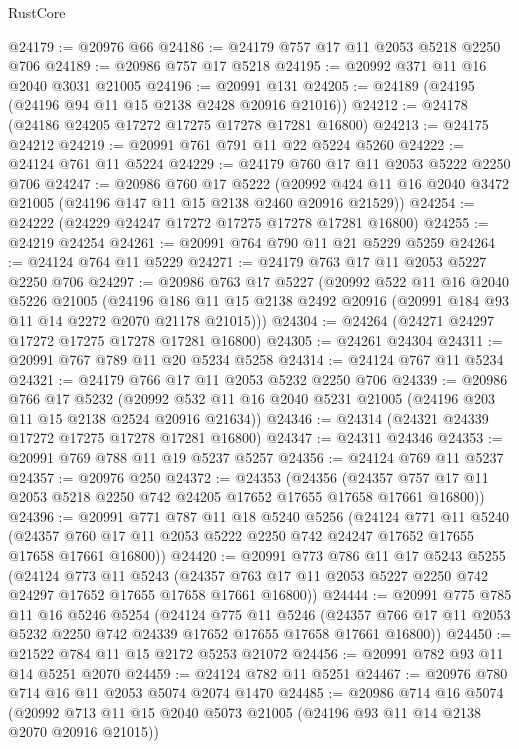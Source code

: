 \begin{lexlean}{RustCore}
\begin{coremodule}
@24179 := @20976 @66
@24186 := @24179 @757 @17 @11 @2053 @5218 @2250 @706
@24189 := @20986 @757 @17 @5218
@24195 := @20992 @371 @11 @16 @2040 @3031 @21005
@24196 := @20991 @131
@24205 := @24189 (@24195 (@24196 @94 @11 @15 @2138 @2428 @20916 @21016))
@24212 := @24178 (@24186 @24205 @17272 @17275 @17278 @17281 @16800)
@24213 := @24175 @24212
@24219 := @20991 @761 @791 @11 @22 @5224 @5260
@24222 := @24124 @761 @11 @5224
@24229 := @24179 @760 @17 @11 @2053 @5222 @2250 @706
@24247 := @20986
    @760
    @17
    @5222
    (@20992 @424 @11 @16 @2040 @3472 @21005 (@24196 @147 @11 @15 @2138 @2460 @20916 @21529))
@24254 := @24222 (@24229 @24247 @17272 @17275 @17278 @17281 @16800)
@24255 := @24219 @24254
@24261 := @20991 @764 @790 @11 @21 @5229 @5259
@24264 := @24124 @764 @11 @5229
@24271 := @24179 @763 @17 @11 @2053 @5227 @2250 @706
@24297 := @20986
    @763
    @17
    @5227
    (@20992
      @522
      @11
      @16
      @2040
      @5226
      @21005
      (@24196 @186 @11 @15 @2138 @2492 @20916 (@20991 @184 @93 @11 @14 @2272 @2070 @21178 @21015)))
@24304 := @24264 (@24271 @24297 @17272 @17275 @17278 @17281 @16800)
@24305 := @24261 @24304
@24311 := @20991 @767 @789 @11 @20 @5234 @5258
@24314 := @24124 @767 @11 @5234
@24321 := @24179 @766 @17 @11 @2053 @5232 @2250 @706
@24339 := @20986
    @766
    @17
    @5232
    (@20992 @532 @11 @16 @2040 @5231 @21005 (@24196 @203 @11 @15 @2138 @2524 @20916 @21634))
@24346 := @24314 (@24321 @24339 @17272 @17275 @17278 @17281 @16800)
@24347 := @24311 @24346
@24353 := @20991 @769 @788 @11 @19 @5237 @5257
@24356 := @24124 @769 @11 @5237
@24357 := @20976 @250
@24372 := @24353
    (@24356 (@24357 @757 @17 @11 @2053 @5218 @2250 @742 @24205 @17652 @17655 @17658 @17661 @16800))
@24396 := @20991
    @771
    @787
    @11
    @18
    @5240
    @5256
    (@24124
      @771
      @11
      @5240
      (@24357 @760 @17 @11 @2053 @5222 @2250 @742 @24247 @17652 @17655 @17658 @17661 @16800))
@24420 := @20991
    @773
    @786
    @11
    @17
    @5243
    @5255
    (@24124
      @773
      @11
      @5243
      (@24357 @763 @17 @11 @2053 @5227 @2250 @742 @24297 @17652 @17655 @17658 @17661 @16800))
@24444 := @20991
    @775
    @785
    @11
    @16
    @5246
    @5254
    (@24124
      @775
      @11
      @5246
      (@24357 @766 @17 @11 @2053 @5232 @2250 @742 @24339 @17652 @17655 @17658 @17661 @16800))
@24450 := @21522 @784 @11 @15 @2172 @5253 @21072
@24456 := @20991 @782 @93 @11 @14 @5251 @2070
@24459 := @24124 @782 @11 @5251
@24467 := @20976 @780 @714 @16 @11 @2053 @5074 @2074 @1470
@24485 := @20986
    @714
    @16
    @5074
    (@20992 @713 @11 @15 @2040 @5073 @21005 (@24196 @93 @11 @14 @2138 @2070 @20916 @21015))

\end{coremodule}
\end{lexlean}
